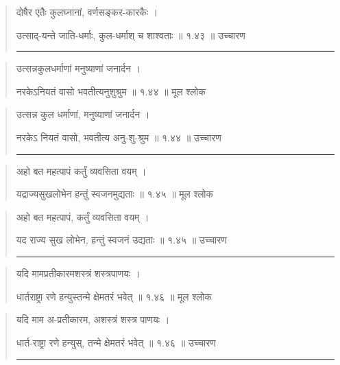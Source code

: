 \begin{quotation}

दोषैर एतैः कुलघ्नानां, वर्णसङ्कर-कारकैः  ।  


उत्साद्-यन्ते जाति-धर्माः, कुल-धर्माश् च शाश्वताः  ॥ १.४३ ॥  उच्चारण

\noindent\rule{16cm}{0.4pt} 
\end{quotation}


\begin{quotation} 

उत्सन्नकुलधर्माणां मनुष्याणां जनार्दन  ।  


नरकेऽनियतं वासो भवतीत्यनुशुश्रुम  ॥ १.४४ ॥  मूल श्लोक
\end{quotation}

\begin{quotation}

उत्सन्न कुल धर्माणां, मनुष्याणां जनार्दन  ।  


नरकेऽ नियतं वासो, भवतीत्य अनु-शु-श्रुम  ॥ १.४४ ॥  उच्चारण

\noindent\rule{16cm}{0.4pt} 
\end{quotation}


\begin{quotation} 
अहो बत महत्पापं कर्तुं व्यवसिता वयम्‌  ।  


यद्राज्यसुखलोभेन हन्तुं स्वजनमुद्यताः  ॥ १.४५ ॥  मूल श्लोक
\end{quotation}

\begin{quotation}

अहो बत महत्पापं, कर्तुं व्यवसिता वयम्  ।  


यद राज्य सुख लोभेन, हन्तुं स्वजनं उद्यताः  ॥ १.४५ ॥  उच्चारण

\noindent\rule{16cm}{0.4pt} 
\end{quotation}


\begin{quotation} 

यदि मामप्रतीकारमशस्त्रं शस्त्रपाणयः  ।  


धार्तराष्ट्रा रणे हन्युस्तन्मे क्षेमतरं भवेत्‌  ॥ १.४६ ॥  मूल श्लोक
\end{quotation}

\begin{quotation}

यदि माम अ-प्रतीकारम, अशस्त्रं शस्त्र पाणयः  ।  


धार्त-राष्ट्रा रणे हन्युस्, तन्मे क्षेमतरं भवेत्  ॥ १.४६ ॥  उच्चारण

\noindent\rule{16cm}{0.4pt} 
\end{quotation}

